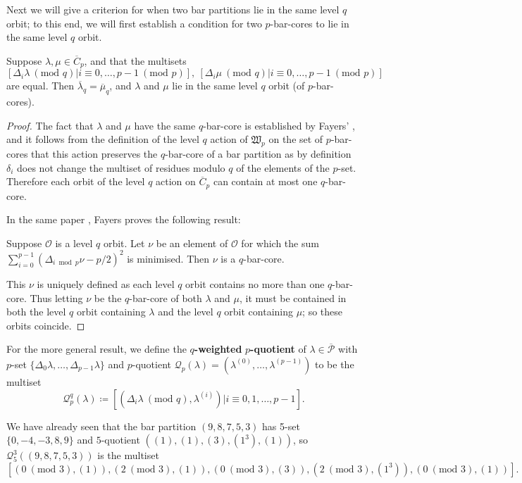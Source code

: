 \documentclass[ALCO, Unicode,published]{cedram}
\newcommand*\nicefrac[2]{#1/#2}
\begin{document}
Next we will give a criterion for when two bar partitions lie in the same level $q$ orbit; to this end, we will first establish a condition for two $p$-bar-cores to lie in the same level $q$ orbit.

\begin{prop}\label{prop7} 
Suppose $\lambda,\mu\in\overline{C}_p$, and that the multisets 
$$[\Delta_i\lambda\:(\text{mod }q)|i\equiv0,\dots,p-1\:(\text{mod }p)],\:[\Delta_i\mu\:(\text{mod }q)|i\equiv0,\dots,p-1\:(\text{mod }p)]$$
are equal. Then $\overline{\lambda}_q=\overline{\mu}_q$, and $\lambda$ and $\mu$ lie in the same level $q$ orbit \textup{(}of $p$-bar-cores\textup{)}. 
\end{prop}
\begin{proof}
The fact that $\lambda$ and $\mu$ have the same $q$-bar-core is established by Fayers' \cite[Proposition 4.1]{F3}, and it follows from the definition of the level $q$ action of $\mathfrak{W}_p$ on the set of $p$-bar-cores that this action preserves the $q$-bar-core of a bar partition as by definition $\delta_i$ does not change the multiset of residues modulo $q$ of the elements of the $p$-set. Therefore each orbit of the level $q$ action on $\overline{C}_p$ can contain at most one $q$-bar-core. 

In the same paper \cite{F3}, Fayers proves the following result: 
\begin{center}
Suppose $\mathcal{O}$ is a level $q$ orbit. Let $\nu$ be an element of $\mathcal{O}$ for which the sum $\sum^{p-1}_{i=0}(\Delta_{i\bmod p}\nu-\nicefrac{p}{2})^2$ is minimised. Then $\nu$ is a $q$-bar-core. 
\end{center}
This $\nu$ is uniquely defined as each level $q$ orbit contains no more than one $q$-bar-core. Thus letting $\nu$ be the $q$-bar-core of both $\lambda$ and $\mu$, it must be contained in both the level $q$ orbit containing $\lambda$ and the level $q$ orbit containing $\mu$; so these orbits coincide. 
\end{proof}

For the more general result, we define the $q$\textbf{-weighted} $p$\textbf{-quotient} of $\lambda\in\overline{\mathcal{P}}$ with $p$-set $\{\Delta_0\lambda,\dots,\Delta_{p-1}\lambda\}$ and $p$-quotient $\mathcal{Q}_p(\lambda)=(\lambda^{(0)},\dots,\lambda^{(p-1)})$ to be the multiset 
$$\mathcal{Q}^q_p(\lambda)\coloneqq[(\Delta_i\lambda\:(\text{mod }q),\lambda^{(i)})|i\equiv0,1,\dots,p-1].$$ 

\begin{exam}
We have already seen that the bar partition $(9,8,7,5,3)$ has 5-set $\{0,-4,-3,8,9\}$ and $5$-quotient $((1),(1),(3),(1^3),(1))$, so $\mathcal{Q}^3_5((9,8,7,5,3))$ is the multiset 
$$[(0\:(\text{mod }3),(1)),(2\:(\text{mod }3),(1)),(0\:(\text{mod }3),(3)),(2\:(\text{mod }3),(1^3)),(0\:(\text{mod }3),(1))].$$
\end{exam}
\end{document}
